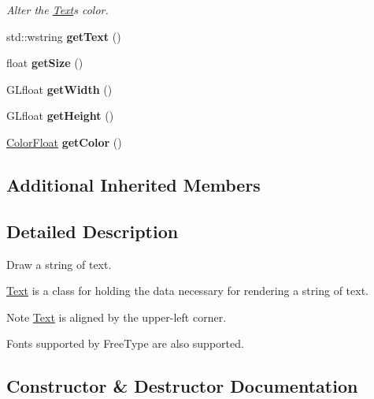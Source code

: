 \begin{DoxyCompactItemize}
\begin{DoxyCompactList}\small\item\em Alter the \hyperlink{classtsgl_1_1_text}{Text}\textquotesingle{}s color. \end{DoxyCompactList}\item 
\mbox{\label{classtsgl_1_1_text_aa71ec240093b19748766127e33244c5c}} 
std\+::wstring {\bfseries get\+Text} ()
\item 
\mbox{\label{classtsgl_1_1_text_ae92cf624b4566f6e6de85171a8848bbc}} 
float {\bfseries get\+Size} ()
\item 
\mbox{\label{classtsgl_1_1_text_ad51009ec093fe0038c24a9dc5e02fe5e}} 
G\+Lfloat {\bfseries get\+Width} ()
\item 
\mbox{\label{classtsgl_1_1_text_a4f4f5beaa3889788c78afa70bdefe626}} 
G\+Lfloat {\bfseries get\+Height} ()
\item 
\mbox{\label{classtsgl_1_1_text_a7130ef2b63c0ae7802816d4fe87fc58c}} 
\hyperlink{structtsgl_1_1_color_float}{Color\+Float} {\bfseries get\+Color} ()
\end{DoxyCompactItemize}
\subsection*{Additional Inherited Members}


\subsection{Detailed Description}
Draw a string of text. 

\hyperlink{classtsgl_1_1_text}{Text} is a class for holding the data necessary for rendering a string of text. \begin{DoxyNote}{Note}
\hyperlink{classtsgl_1_1_text}{Text} is aligned by the upper-\/left corner. 

Fonts supported by Free\+Type are also supported. 
\end{DoxyNote}


\subsection{Constructor \& Destructor Documentation}
\mbox{\label{classtsgl_1_1_text_a7c0ab1c94262edda688697561f155742}} 

